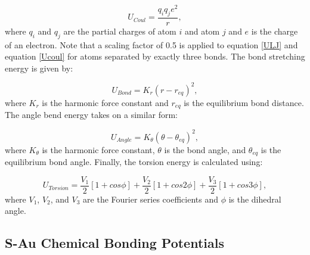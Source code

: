 \documentclass[10pt]{report}  %
\begin{document}
\begin{equation}U_{Coul} = \frac{q_{i}q_{j}e^{2}}{r},\label{Ucoul}
\end{equation} where $q_{i}$ and $q_{j}$ are the partial charges of atom $i$ and atom $j$ and $e$ is the charge of an electron. Note that a scaling factor of 0.5 is applied to equation \ref{ULJ} and equation \ref{Ucoul} for atoms separated by exactly three bonds. The bond stretching energy is given by:

\begin{equation}U_{Bond} = K_{r}\left(r - r_{eq}\right)^{2} ,\label{bond-stretch}\end{equation} where $K_{r}$ is the harmonic force constant and $r_{eq}$ is the equilibrium bond distance. The angle bend energy takes on a similar form: 

\begin{equation}U_{Angle} = K_{\theta}\left(\theta - \theta_{eq}\right)^{2} ,\label{angle-bend}\end{equation} where $K_{\theta}$ is the harmonic force constant, $\theta$ is the bond angle, and $\theta_{eq}$ is the equilibrium bond angle. Finally, the torsion energy is calculated using:

\begin{equation} U_{Torsion} = \frac{V_{1}}{2}\left[1 + cos\phi\right] + \frac{V_{2}}{2}\left[1 + cos2\phi\right] + \frac{V_{3}}{2}\left[1 + cos3\phi\right],\label{torsion}\end{equation} where $V_{1}$, $V_{2}$, and $V_{3}$ are the Fourier series coefficients and $\phi$ is the dihedral angle.

\subsection{S-Au Chemical Bonding Potentials}
\end{document}
